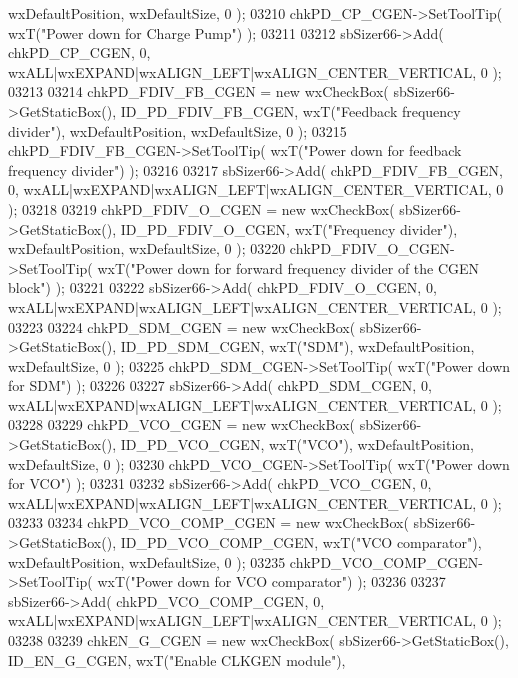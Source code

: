 \begin{DoxyCode}
      wxDefaultPosition, wxDefaultSize, 0 );
03210     chkPD_CP_CGEN->SetToolTip( wxT(\textcolor{stringliteral}{"Power down for Charge Pump"}) );
03211     
03212     sbSizer66->Add( chkPD_CP_CGEN, 0, wxALL|wxEXPAND|wxALIGN\_LEFT|wxALIGN\_CENTER\_VERTICAL, 0 );
03213     
03214     chkPD_FDIV_FB_CGEN = \textcolor{keyword}{new} wxCheckBox( sbSizer66->GetStaticBox(), 
      ID_PD_FDIV_FB_CGEN, wxT(\textcolor{stringliteral}{"Feedback frequency divider"}), wxDefaultPosition, wxDefaultSize, 0 );
03215     chkPD_FDIV_FB_CGEN->SetToolTip( wxT(\textcolor{stringliteral}{"Power down for feedback frequency divider"}) );
03216     
03217     sbSizer66->Add( chkPD_FDIV_FB_CGEN, 0, wxALL|wxEXPAND|wxALIGN\_LEFT|wxALIGN\_CENTER\_VERTICAL, 0 );
03218     
03219     chkPD_FDIV_O_CGEN = \textcolor{keyword}{new} wxCheckBox( sbSizer66->GetStaticBox(), 
      ID_PD_FDIV_O_CGEN, wxT(\textcolor{stringliteral}{"Frequency divider"}), wxDefaultPosition, wxDefaultSize, 0 );
03220     chkPD_FDIV_O_CGEN->SetToolTip( wxT(\textcolor{stringliteral}{"Power down for forward frequency divider of the CGEN block"}) );
03221     
03222     sbSizer66->Add( chkPD_FDIV_O_CGEN, 0, wxALL|wxEXPAND|wxALIGN\_LEFT|wxALIGN\_CENTER\_VERTICAL, 0 );
03223     
03224     chkPD_SDM_CGEN = \textcolor{keyword}{new} wxCheckBox( sbSizer66->GetStaticBox(), ID_PD_SDM_CGEN, wxT(\textcolor{stringliteral}{"SDM"}), 
      wxDefaultPosition, wxDefaultSize, 0 );
03225     chkPD_SDM_CGEN->SetToolTip( wxT(\textcolor{stringliteral}{"Power down for SDM"}) );
03226     
03227     sbSizer66->Add( chkPD_SDM_CGEN, 0, wxALL|wxEXPAND|wxALIGN\_LEFT|wxALIGN\_CENTER\_VERTICAL, 0 );
03228     
03229     chkPD_VCO_CGEN = \textcolor{keyword}{new} wxCheckBox( sbSizer66->GetStaticBox(), ID_PD_VCO_CGEN, wxT(\textcolor{stringliteral}{"VCO"}), 
      wxDefaultPosition, wxDefaultSize, 0 );
03230     chkPD_VCO_CGEN->SetToolTip( wxT(\textcolor{stringliteral}{"Power down for VCO"}) );
03231     
03232     sbSizer66->Add( chkPD_VCO_CGEN, 0, wxALL|wxEXPAND|wxALIGN\_LEFT|wxALIGN\_CENTER\_VERTICAL, 0 );
03233     
03234     chkPD_VCO_COMP_CGEN = \textcolor{keyword}{new} wxCheckBox( sbSizer66->GetStaticBox(), 
      ID_PD_VCO_COMP_CGEN, wxT(\textcolor{stringliteral}{"VCO comparator"}), wxDefaultPosition, wxDefaultSize, 0 );
03235     chkPD_VCO_COMP_CGEN->SetToolTip( wxT(\textcolor{stringliteral}{"Power down for VCO comparator"}) );
03236     
03237     sbSizer66->Add( chkPD_VCO_COMP_CGEN, 0, wxALL|wxEXPAND|wxALIGN\_LEFT|wxALIGN\_CENTER\_VERTICAL, 0 );
03238     
03239     chkEN_G_CGEN = \textcolor{keyword}{new} wxCheckBox( sbSizer66->GetStaticBox(), ID_EN_G_CGEN, wxT(\textcolor{stringliteral}{"Enable CLKGEN module"}), 

\end{DoxyCode}
